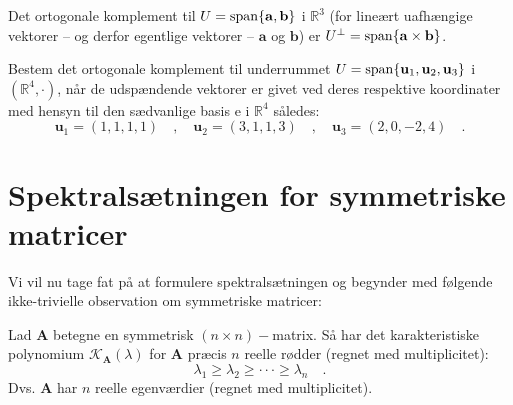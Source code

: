 \begin{example}
Det ortogonale komplement til $U = \mathrm{span}\{\mathbf{a}, \mathbf{b}\}$ i $\mathbb{R}^{3}$ (for lineært uafhængige vektorer -- og derfor egentlige vektorer -- $\mathbf{a}$ og $\mathbf{b}$) er $U^{\bot} = \mathrm{span}\{\mathbf{a} \times \mathbf{b}\}$.
\end{example}

\begin{exercise}
Bestem det ortogonale komplement til underrummet $U = \mathrm{span}\{\mathbf{u}_{1}, \mathbf{u}_{2}, \mathbf{u}_{3}\}$
i $(\mathbb{R}^{4}, \bm{\cdot})$, når de udspændende vektorer er givet ved deres respektive koordinater med hensyn til den sædvanlige basis e i $\mathbb{R}^{4}$ således:
\begin{equation}
\mathbf{u}_{1} = {(1,1,1,1)} \quad , \quad \mathbf{u}_{2} = {(3,1,1,3)} \quad , \quad \mathbf{u}_{3} = {(2,0,-2,4)} \quad .
\end{equation}
\end{exercise}







\section{Spektralsætningen for symmetriske matricer} \label{secSpektral}

Vi vil nu tage fat på at formulere spektralsætningen og begynder med følgende ikke-trivielle observation om symmetriske matricer:


\begin{theorem} \label{thmSymReel}
Lad $\mathbf{A}$ betegne en symmetrisk $(n \times n)-$matrix. Så har det karakteristiske polynomium $\mathcal{K}_{\mathbf{A}}(\lambda)$ for $\mathbf{A}$
præcis $n$ reelle rødder (regnet med multiplicitet):
\begin{equation}
\lambda_{1} \geq \lambda_{2} \geq \cdot \cdot \cdot \geq \lambda_{n} \quad.
\end{equation}
Dvs. $\mathbf{A}$ har $n$ reelle egenværdier (regnet med multiplicitet).
\end{theorem}

